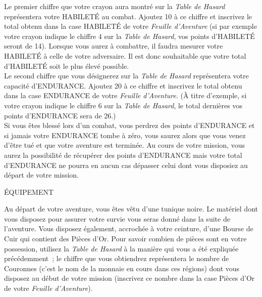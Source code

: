 \documentclass[10pt]{book}
\begin{document}
Le premier chiffre que votre crayon aura montré sur la \textit{Table de
Hasard} représentera votre HABILETÉ au combat. Ajoutez 10 à ce
chiffre et inscrivez le total obtenu dans la case HABILETÉ de votre
\textit{Feuille d'Aventure} (si par exemple votre crayon indique le chiffre
4 sur la \textit{Table de Hasard}, vos points d'HABILETÉ seront de 14).
Lorsque vous aurez à combattre, il faudra mesurer votre
HABILETÉ à celle de votre adversaire. Il est donc souhaitable que
votre total d'HABILETÉ soit le plus élevé possible.\\

Le second chiffre que vous désignerez sur la \textit{Table de Hasard} représentera
votre capacité d'ENDURANCE. Ajoutez 20 à ce chiffre et inscrivez le total obtenu
dans la case ENDURANCE de votre \textit{Feuille d'Aventure}. (À titre d'exemple,
si votre crayon indique le chiffre 6 sur la \textit{Table de Hasard}, le total dernières
vos points d'ENDURANCE sera de 26.)\\

Si vous êtes blessé lors d'un combat, vous perdrez des points d'ENDURANCE et si
jamais votre ENDURANCE tombe à zéro, vous saurez alors que vous venez d'être tué et
que votre aventure est terminée. Au cours de votre mission, vous aurez la possibilité
de récupérer des points d'ENDURANCE mais votre total d'ENDURANCE ne pourra en aucun
cas dépasser celui dont vous disposiez au départ de votre mission.


\begin{center}
  ÉQUIPEMENT
\end{center}

Au départ de votre aventure, vous êtes vêtu d'une tunique noire. Le matériel
dont vous disposez pour assurer votre survie vous seras donné dans la suite de
l'aventure. Vous disposez également, accrochée à votre ceinture, d'une Bourse
de Cuir qui contient des Pièces d'Or. Pour savoir combien de pièces sont en votre possession,
utilisez la \textit{Table de Hasard} à la manière qui vous a été expliquée précédemment~;
le chiffre que vous obtiendrez représentera le nombre de Couronnes (c'est le nom de la monnaie
en cours dans ces régions) dont vous disposez au début de votre mission (inscrivez ce nombre
dans la case Pièces d'Or de votre \textit{Feuille d'Aventure}).\\
\end{document}
